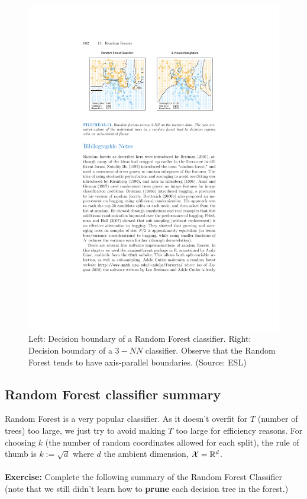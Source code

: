 \documentclass[11pt]{article}
\newcommand{\R}{\ensuremath{\mathbb{R}}}
\begin{document}
\begin{figure}[H]
  \centering
  \includegraphics[width=5in]{rf_decision.pdf}
  \caption{Left: Decision boundary of a Random Forest classifier. Right:
  Decision boundary of a $3-NN$ classifier. Observe that the Random Forest tends
to have axis-parallel boundaries. (Source: ESL)}
\end{figure}

\subsection{Random Forest classifier summary}

Random Forest is a very popular classifier. As it doesn't overfit for $T$
(number of trees) too large, we just try to avoid making $T$ too large for
efficiency reasons. For choosing $k$ (the number of random coordinates allowed
for each split), the rule of thumb is $k:=\sqrt{d}$ where $d$ the ambient
  dimension, $\X=\R^d$. 
\\~\\
{\bf Exercise:} Complete the following summary of the Random Forest Classifier
(note that we still didn't learn how to {\bf prune} each decision tree in the forest.)
\end{document}
